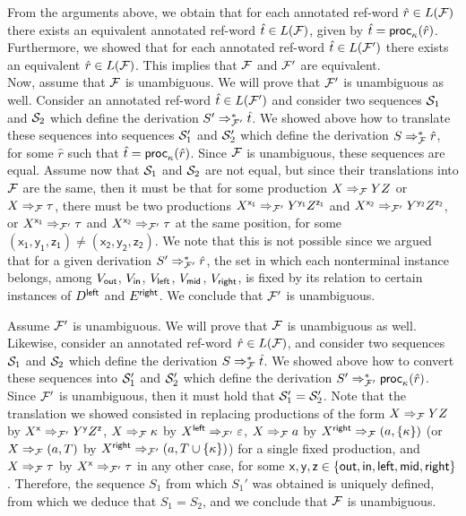 From the arguments above, we obtain that for each annotated ref-word $\hat{r}\in L(\mathcal{F})$ there exists an equivalent annotated ref-word $\hat{t}\in L(\mathcal{F})$, given by $\hat{t} = \mathsf{proc}_\kappa(\hat{r})$. Furthermore, we showed that for each annotated ref-word $\hat{t}\in L(\mathcal{F}')$ there exists an equivalent $\hat{r}\in L(\mathcal{F})$. This implies that $\mathcal{F}$ and $\mathcal{F}'$ are equivalent.\\

Now, assume that $\mathcal{F}$ is unambiguous. We will prove that $\mathcal{F}'$ is unambiguous as well. Consider an annotated ref-word $\hat{t}\in L(\mathcal{F}')$ and consider two sequences $\mathcal{S}_1$ and $\mathcal{S}_2$ which define the derivation $S'\Rightarrow_{\mathcal{F}'}^*\hat{t}$. We showed above how to translate these sequences into sequences $\mathcal{S}_1'$ and $\mathcal{S}_2'$ which define the derivation $S\Rightarrow_{\mathcal{F}}^*	\hat{r}$, for some $\hat{r}$ such that $\hat{t} = \mathsf{proc}_\kappa(\hat{r})$. Since $\mathcal{F}$ is unambiguous, these sequences are equal. Assume now that $\mathcal{S}_1$ and $\mathcal{S}_2$ are not equal, but since their translations into $\mathcal{F}$ are the same, then it must be that for some production $X\Rightarrow_{\mathcal{F}}YZ$ or $X\Rightarrow_{\mathcal{F}}\tau$, there must be two productions $X^\mathsf{x_1} \Rightarrow_{\mathcal{F}'} Y^\mathsf{y_1}  Z^\mathsf{z_1}$ and $X^\mathsf{x_2} \Rightarrow_{\mathcal{F}'} Y^\mathsf{y_2}  Z^\mathsf{z_2}$, or $X^\mathsf{x_1} \Rightarrow_{\mathcal{F}'}\tau$ and $X^\mathsf{x_2} \Rightarrow_{\mathcal{F}'}\tau$ at the same position, for some $(\mathsf{x_1}, \mathsf{y_1}, \mathsf{z_1}) \neq (\mathsf{x_2}, \mathsf{y_2}, \mathsf{z_2})$. We note that this is not possible since we argued that for a given derivation $S'\Rightarrow_{\mathcal{F}'}^*\hat{r}$, the set in which each nonterminal instance belongs, among $V_{\mathsf{out}}$, $V_{\mathsf{in}}$, $V_{\mathsf{left}}$, $V_{\mathsf{mid}}$, $V_{\mathsf{right}}$, is fixed by its relation to certain instances of $D^{\mathsf{left}}$ and $E^{\mathsf{right}}$. We conclude that $\mathcal{F}'$ is unambiguous.

Assume $\mathcal{F}'$ is unambiguous. We will prove that $\mathcal{F}$ is unambiguous as well. Likewise, consider an annotated ref-word $\hat{r}\in L(\mathcal{F})$, and consider two sequences $\mathcal{S}_1$ and $\mathcal{S}_2$ which define the derivation $S\Rightarrow_{\mathcal{F}}^*\hat{t}$. We showed above how to convert these sequences into $\mathcal{S}_1'$ and $\mathcal{S}_2'$ which define the derivation $S'\Rightarrow_{\mathcal{F}'}^*\mathsf{proc}_\kappa(\hat{r})$. Since $\mathcal{F}'$ is unambiguous, then it must hold that $\mathcal{S}_1' = \mathcal{S}_2'$. Note that the translation we showed consisted in replacing productions of the form $X\Rightarrow_{\mathcal{F}}YZ$ by $X^\mathsf{x} \Rightarrow_{\mathcal{F}'} Y^\mathsf{y}  Z^\mathsf{z}$, $X\Rightarrow_{\mathcal{F}}\kappa$ by $X^{\mathsf{left}}\Rightarrow_{\mathcal{F}'}\varepsilon$, $X\Rightarrow_{\mathcal{F}}a$ by $X^{\mathsf{right}}\Rightarrow_{\mathcal{F}}(a, \{\kappa\})$ (or $X\Rightarrow_{\mathcal{F}}(a, T)$ by $X^{\mathsf{right}}\Rightarrow_{\mathcal{F}'}(a, T\cup \{\kappa\})$) for a single fixed production, and $X\Rightarrow_{\mathcal{F}}\tau$ by $X^\mathsf{x}\Rightarrow_{\mathcal{F}'}\tau$ in any other case, for some $\mathsf{x}, \mathsf{y}, \mathsf{z}\in \{\mathsf{out}, \mathsf{in}, \mathsf{left}, \mathsf{mid}, \mathsf{right}\}$. Therefore, the sequence $S_1$ from which $S_1'$ was obtained is uniquely defined, from which we deduce that $S_1 = S_2$, and we conclude that $\mathcal{F}$ is unambiguous.\\


